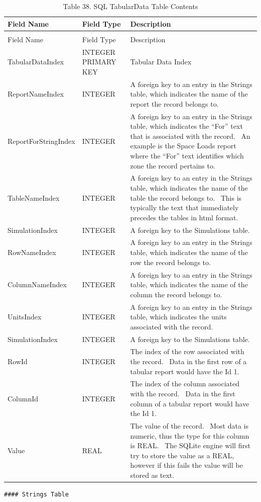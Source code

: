 \begin{longtable}[c]{p{1.5in}p{1.5in}p{3.0in}}
\caption{Table 38. SQL TabularData Table Contents \label{table:table-38.-sql-tabulardata-table-contents}} \tabularnewline
\toprule 
Field Name & Field Type & Description \tabularnewline
\midrule
\endfirsthead

\caption[]{Table 38. SQL TabularData Table Contents} \tabularnewline
\toprule 
Field Name & Field Type & Description \tabularnewline
\midrule
\endhead

TabularDataIndex & INTEGER PRIMARY KEY & Tabular Data Index \tabularnewline
ReportNameIndex & INTEGER & A foreign key to an entry in the Strings table, which indicates the name of the report the record belongs to. \tabularnewline
ReportForStringIndex & INTEGER & A foreign key to an entry in the Strings table, which indicates the “For” text that is associated with the record.~ An example is the Space Loads report where the “For” text identifies which zone the record pertains to. \tabularnewline
TableNameIndex & INTEGER & A foreign key to an entry in the Strings table, which indicates the name of the table the record belongs to.~ This is typically the text that immediately precedes the tables in html format. \tabularnewline
SimulationIndex & INTEGER & A foreign key to the Simulations table. \tabularnewline
RowNameIndex & INTEGER & A foreign key to an entry in the Strings table, which indicates the name of the row the record belongs to. \tabularnewline
ColumnNameIndex & INTEGER & A foreign key to an entry in the Strings table, which indicates the name of the column the record belongs to. \tabularnewline
UnitsIndex & INTEGER & A foreign key to an entry in the Strings table, which indicates the units associated with the record. \tabularnewline
SimulationIndex & INTEGER & A foreign key to the Simulations table. \tabularnewline
RowId & INTEGER & The index of the row associated with the record.~ Data in the first row of a tabular report would have the Id 1. \tabularnewline
ColumnId & INTEGER & The index of the column associated with the record.~ Data in the first column of a tabular report would have the Id 1. \tabularnewline
Value & REAL & The value of the record.~ Most data is numeric, thus the type for this column is REAL.~ The SQLite engine will first try to store the value as a REAL, however if this fails the value will be stored as text. \tabularnewline
\bottomrule
\end{longtable}

\begin{lstlisting}
#### Strings Table
\end{lstlisting}

